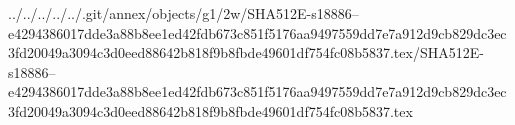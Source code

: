 ../../../../../.git/annex/objects/g1/2w/SHA512E-s18886--e4294386017dde3a88b8ee1ed42fdb673c851f5176aa9497559dd7e7a912d9cb829dc3ec3fd20049a3094c3d0eed88642b818f9b8fbde49601df754fc08b5837.tex/SHA512E-s18886--e4294386017dde3a88b8ee1ed42fdb673c851f5176aa9497559dd7e7a912d9cb829dc3ec3fd20049a3094c3d0eed88642b818f9b8fbde49601df754fc08b5837.tex